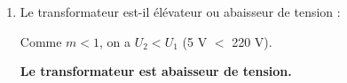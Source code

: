 \documentclass[11pt,a4paper]{article}
\begin{document}
\begin{enumerate}
\begin{tcolorbox}[colback=red!5!white,colframe=red!75!black]
{\color{blue}
$$m = \dfrac{U_2}{U_1} = \dfrac{5}{220} \approx 0{,}023$$

\textbf{Le rapport de transformation est $m \approx 0{,}023$.}
}
\end{tcolorbox}

    \item Le transformateur est-il élévateur ou abaisseur de tension :

\begin{tcolorbox}[colback=red!5!white,colframe=red!75!black]
{\color{blue}
Comme $m < 1$, on a $U_2 < U_1$ (5 V $<$ 220 V).

\textbf{Le transformateur est abaisseur de tension.}
}
\end{tcolorbox}
    


\end{enumerate}

\newpage 
\end{document}
